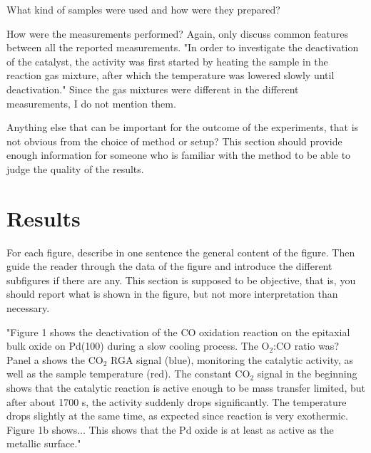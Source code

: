 \documentclass[aps,prl,groupedaddress,twocolumn]{revtex4-1}
\begin{document}
What kind of samples were used and how were they prepared?

How were the measurements performed? Again, only discuss common features between all the reported measurements. "In order to investigate the deactivation of the catalyst, the activity was first started by heating the sample in the reaction gas mixture, after which the temperature was lowered slowly until deactivation." Since the gas mixtures were different in the different measurements, I do not mention them.

Anything else that can be important for the outcome of the experiments, that is not obvious from the choice of method or setup? This section should provide enough information for someone who is familiar with the method to be able to judge the quality of the results.


\section{Results}
For each figure, describe in one sentence the general content of the figure. Then guide the reader through the data of the figure and introduce the different subfigures if there are any. This section is supposed to be objective, that is, you should report what is shown in the figure, but not more interpretation than necessary.

"Figure 1 shows the deactivation of the CO oxidation reaction on the epitaxial bulk oxide on Pd(100) during a slow cooling process. The O$_2$:CO ratio was? Panel a shows the CO$_2$ RGA signal (blue), monitoring the catalytic activity, as well as the sample temperature (red). The constant CO$_2$ signal in the beginning shows that the catalytic reaction is active enough to be mass transfer limited, but after about 1700 s, the activity suddenly drops significantly. The temperature drops slightly at the same time, as expected since reaction is very exothermic. Figure 1b shows...  This shows that the Pd oxide is at least as active as the metallic surface."
\end{document}
